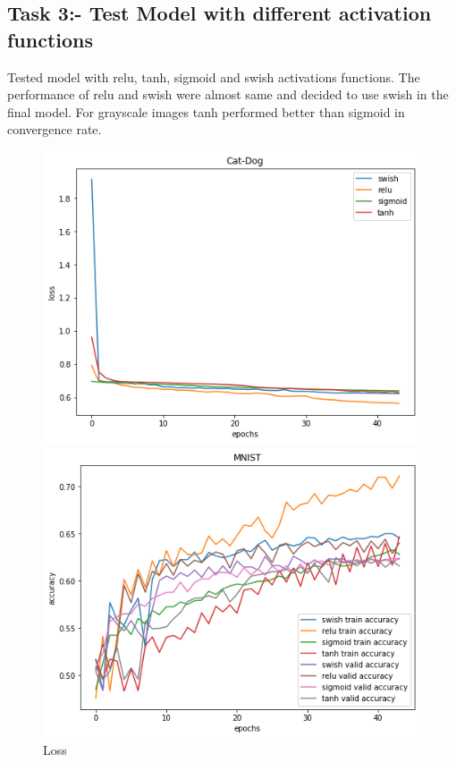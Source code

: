 \documentclass{article}
\begin{document}
\subsection{Task 3:- Test Model with different activation functions}

Tested model with relu, tanh, sigmoid and swish activations functions. The performance of relu and swish were almost same and decided to use swish in the final model. For grayscale images tanh performed better than sigmoid in convergence rate.

\begin{figure}[!htb]
	\includegraphics[width=\linewidth]{../output_plots/part_2_task_3_loss.png}
	\caption{Loss}\label{fig:part_2_task_3_loss}
	\endminipage\hfill
	\includegraphics[width=\linewidth]{../output_plots/part_2_task_3_accuracy.png}

\end{figure}
\end{document}
